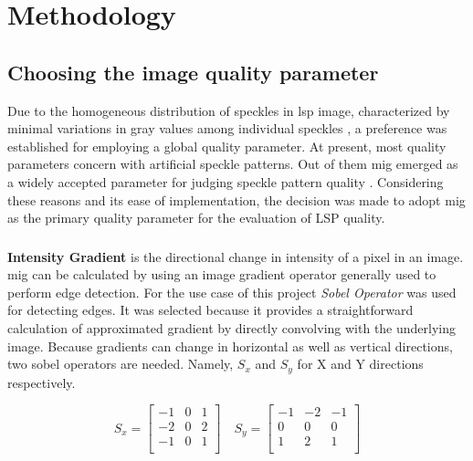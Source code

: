 \chapter{Methodology}\label{chapter:methodology}    
    \section{Choosing the image quality parameter}
    Due to the homogeneous distribution of speckles in \gls{lsp} image, characterized by minimal variations in gray values among individual speckles \cite{song}, a preference was established for employing a global quality parameter. At present, most quality parameters concern with artificial speckle patterns. Out of them \gls{mig} emerged as a widely accepted parameter for judging speckle pattern quality \cite{hu_ef}. Considering these reasons and its ease of implementation, the decision was made to adopt \gls{mig} as the primary quality parameter for the evaluation of LSP quality.
    
        \subsection*{}
            \textbf{Intensity Gradient} is the directional change in intensity of a pixel in an image. \gls{mig} can be calculated by using an image gradient operator generally used to perform edge detection. For the use case of this project \emph{Sobel Operator} was used for detecting edges. It was selected because it provides a straightforward calculation of approximated gradient by directly convolving with the underlying image. Because gradients can change in horizontal as well as vertical directions, two sobel operators are needed. Namely, $S_x$ and $S_y$ for X and Y directions respectively.

            \[
                S_x = 
                \begin{bmatrix}
                    -1 & 0 & 1 \\
                    -2 & 0 & 2 \\
                    -1 & 0 & 1 \\
                \end{bmatrix}
                \quad
                S_y = 
                \begin{bmatrix}
                    -1 & -2 & -1 \\
                    0 & 0 & 0 \\
                    1 & 2 & 1 \\
                \end{bmatrix}
            \]

